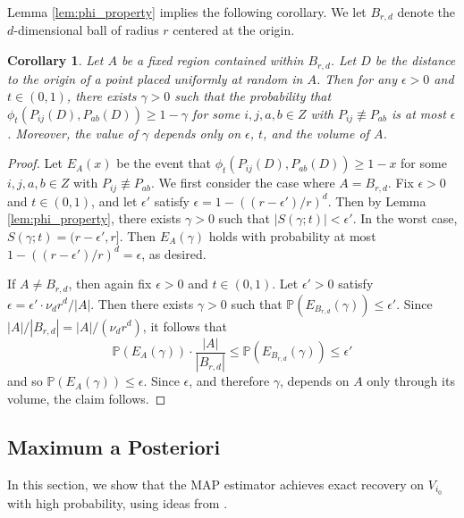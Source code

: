 \documentclass{article}
\newcommand{\1}{\mathbbm{1}}
\theoremstyle{definition}
\theoremstyle{plain}
\newtheorem{corollary}{Corollary}
\begin{document}
Lemma \ref{lem:phi_property} implies the following corollary. We let $B_{r,d}$ denote the $d$-dimensional ball of radius $r$ centered at the origin.
\begin{corollary}
\label{cor:distinguishing_vertices}
Let $A$ be a fixed region contained within $B_{r,d}$. Let $D$ be the distance to the origin of a point placed uniformly at random in $A$. Then for any $\epsilon > 0$ and $t \in (0,1)$, there exists $\gamma > 0$ such that the probability that $\phi_t(P_{ij}(D), P_{ab}(D) ) \geq 1 - \gamma$ for some $i,j,a,b \in Z$ with $P_{ij} \not \equiv P_{ab}$ is at most $\epsilon$. Moreover, the value of $\gamma$ depends only on $\epsilon$, $t$, and the volume of $A$.
\end{corollary}
\begin{proof}
Let $E_A(x)$ be the event that $\phi_t(P_{ij}(D), P_{ab}(D) ) \geq 1 - x$ for some $i,j,a,b \in Z$ with $P_{ij} \not \equiv P_{ab}$.
We first consider the case where $A = B_{r,d}$. Fix $\epsilon > 0$ and $t \in (0,1)$, and let $\epsilon'$ satisfy $\epsilon = 1 - ((r-\epsilon')/r)^d$. Then by Lemma \ref{lem:phi_property}, there exists $\gamma > 0$ such that $|S(\gamma; t)| < \epsilon'$. In the worst case, $S(\gamma; t) = (r-\epsilon', r]$. Then $E_A(\gamma)$ holds with probability at most $1- ((r-\epsilon')/r)^d = \epsilon$, as desired.

If $A \neq B_{r,d}$, then again fix $\epsilon > 0$ and $t \in (0,1)$. Let $\epsilon' > 0$ satisfy $\epsilon = \epsilon' \cdot \nu_d r^d / |A|$. Then there exists $\gamma > 0$ such that $\mathbb{P}(E_{B_{r,d}}(\gamma)) \leq \epsilon'$. Since $|A| / |B_{r, d}| = |A| / (\nu_d r^d)$, it follows that 
\begin{equation*}
\mathbb{P}(E_{A}(\gamma)) \cdot \frac{|A|}{|B_{r,d}|} \leq \mathbb{P}(E_{B_{r,d}}(\gamma)) \leq \epsilon' 
\end{equation*}
and so
$\mathbb{P}(E_{A}(\gamma)) \leq \epsilon$. Since $\epsilon$, and therefore $\gamma$, depends on $A$ only through its volume, the claim follows.
\end{proof}




\subsection{Maximum a Posteriori}
\label{subappx:MAP_proof}
In this section, we show that the MAP estimator achieves exact recovery on $V_{i_0}$ with high probability, using ideas from \cite{Gaudio+2025}.  
\end{document}
